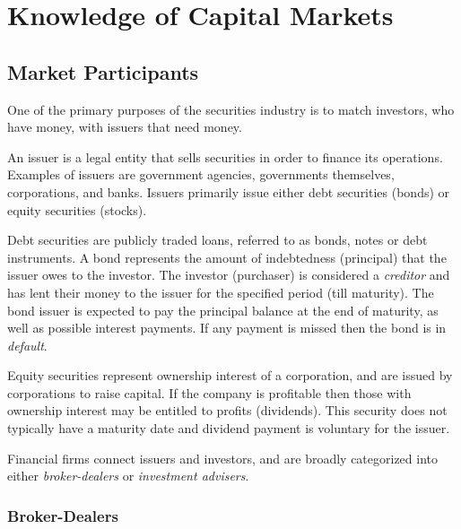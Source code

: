 \section{Knowledge of Capital Markets}

\medskip

\subsection{Market Participants}

\medskip

One of the primary purposes of the securities industry is to match investors, who have money, with issuers that need money.

\medskip

\begin{definition}[Issuer]
An issuer is a legal entity that sells securities in order to finance its operations. Examples of issuers are government agencies, governments themselves, corporations, and banks. Issuers primarily issue either debt securities (bonds) or equity securities (stocks). 
\end{definition}

Debt securities are publicly traded loans, referred to as bonds, notes or debt instruments. A bond represents the amount of indebtedness (principal) that the issuer owes to the investor. The investor (purchaser) is considered a \textit{creditor} and has lent their money to the issuer for the specified period (till maturity). The bond issuer is expected to pay the principal balance at the end of maturity, as well as possible interest payments. If any payment is missed then the bond is in \textit{default}.

Equity securities represent ownership interest of a corporation, and are issued by corporations to raise capital. If the company is profitable then those with ownership interest may be entitled to profits (dividends). This security does not typically have a maturity date and dividend payment is voluntary for the issuer. 

Financial firms connect issuers and investors, and are broadly categorized into either \textit{broker-dealers} or \textit{investment advisers}.

\bigskip

\subsubsection{Broker-Dealers}

